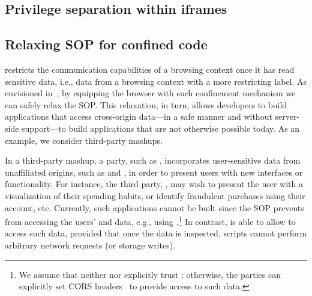 \subsection{Privilege separation within iframes}
\label{sec:system:extension}


\subsection{Relaxing SOP for confined code}
\label{sec:system:mashup}
%
\sys{} restricts the communication capabilities of a browsing context
once it has read sensitive data, i.e., data from a browsing context
with a more restricting label.
%
As envisioned in~, by equipping the browser with such
confinement mechanism we can safely relax the SOP.
%
This relaxation, in turn, allows developers to build applications that access
cross-origin data---in a safe manner and without server-side support---to build
applications that are not otherwise possible today.
%
As an example, we consider third-party mashups.

In a third-party mashup, a party, such as ,
incorporates user-sensitive data from unaffiliated origins, such as
 and , in order to present users with new
interfaces or functionality.
%
For instance, the third party, , may wish to present the user with a
visualization of their spending habits, or identify fraudulent
 purchases using their  account, etc.
%
Currently, such applications cannot be built since the SOP prevents
 from accessing the users'  and
 data, e.g., using \xhr{}.\footnote{
 We assume that neither  nor 
 explicitly trust ; otherwise, the parties can
 explicitly set CORS headers~ to provide 
 access to such data.
}
%
In contrast, \sys{} is able to allow  to access such
data, provided that once the data is inspected, scripts cannot perform
arbitrary network requests (or storage writes).
 
